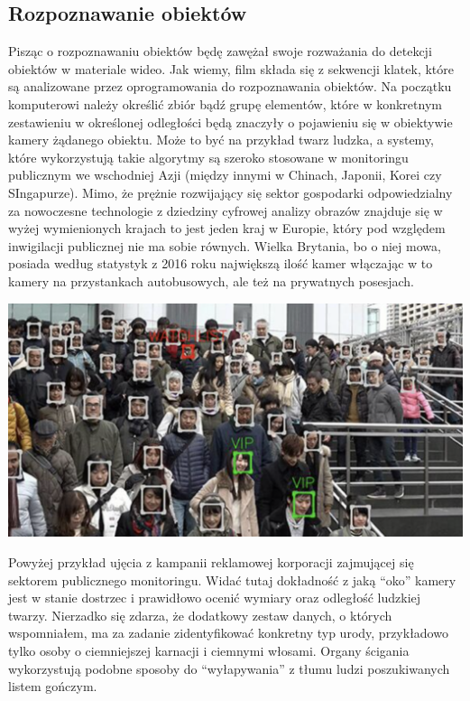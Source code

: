 \documentclass{article}
\begin{document}
\subsection{Rozpoznawanie obiektów}
\par
Pisząc o rozpoznawaniu obiektów będę zawężał swoje rozważania do detekcji obiektów w materiale wideo. Jak wiemy, film składa się z sekwencji klatek, które są analizowane przez oprogramowania do rozpoznawania obiektów. Na początku komputerowi należy określić zbiór bądź grupę elementów, które w konkretnym zestawieniu w określonej odległości będą znaczyły o pojawieniu się w obiektywie kamery żądanego obiektu. Może to być na przykład twarz ludzka, a systemy, które wykorzystują takie algorytmy są szeroko stosowane w monitoringu publicznym we wschodniej Azji (między innymi w Chinach, Japonii, Korei czy SIngapurze). Mimo, że prężnie rozwijający się sektor gospodarki odpowiedzialny za nowoczesne technologie z dziedziny cyfrowej analizy obrazów znajduje się w wyżej wymienionych krajach to jest jeden kraj w Europie, który pod względem inwigilacji publicznej nie ma sobie równych. Wielka Brytania, bo o niej mowa, posiada według statystyk z 2016 roku największą ilość kamer włączając w to kamery na przystankach autobusowych, ale też na prywatnych posesjach.
\begin{center}
	\includegraphics[width=15cm]{detect}
\end{center}
\par
Powyżej przykład ujęcia z kampanii reklamowej korporacji zajmującej się sektorem publicznego monitoringu. Widać tutaj dokładność z jaką “oko” kamery jest w stanie dostrzec i prawidłowo ocenić wymiary oraz odległość ludzkiej twarzy. Nierzadko się zdarza, że dodatkowy zestaw danych, o których wspomniałem, ma za zadanie zidentyfikować konkretny typ urody, przykładowo tylko osoby o ciemniejszej karnacji i ciemnymi włosami. Organy ścigania wykorzystują podobne sposoby do “wyłapywania” z tłumu ludzi poszukiwanych listem gończym.
\end{document}
